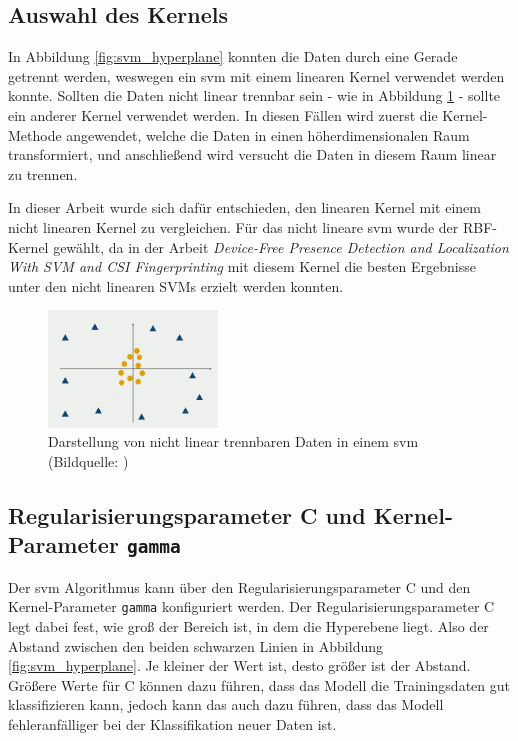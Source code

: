 \subsection{Auswahl des Kernels}

In Abbildung \ref{fig:svm_hyperplane} konnten die Daten durch eine Gerade getrennt werden, weswegen ein \gls{svm} mit einem linearen Kernel verwendet werden konnte. Sollten die Daten nicht linear trennbar sein - wie in Abbildung \ref{fig:source_svm_rbf} - sollte ein anderer Kernel verwendet werden. In diesen Fällen wird zuerst die Kernel-Methode angewendet, welche die Daten in einen höherdimensionalen Raum transformiert, und anschließend wird versucht die Daten in diesem Raum linear zu trennen.

In dieser Arbeit wurde sich dafür entschieden, den linearen Kernel mit einem nicht linearen Kernel zu vergleichen. Für das nicht lineare \gls{svm} wurde der RBF-Kernel gewählt, da in der Arbeit \textit{Device-Free Presence Detection and Localization With SVM and CSI Fingerprinting} mit diesem Kernel die besten Ergebnisse unter den nicht linearen SVMs erzielt werden konnten.

\begin{figure}[H]
    \centering
    \includegraphics[width=0.4\textwidth]{images/source_svm_rbf.png}
    \caption{Darstellung von nicht linear trennbaren Daten in einem \gls{svm} (Bildquelle: \citeauthor{databasecampSupportVector} \citeyear{databasecampSupportVector})}
    \label{fig:source_svm_rbf}
\end{figure}

\subsection{Regularisierungsparameter C und Kernel-Parameter \texttt{gamma}}


Der \gls{svm} Algorithmus kann über den Regularisierungsparameter C und den Kernel-Parameter \texttt{gamma} konfiguriert werden. Der Regularisierungsparameter C legt dabei fest, wie groß der Bereich ist, in dem die Hyperebene liegt. Also der Abstand zwischen den beiden schwarzen Linien in Abbildung \ref{fig:svm_hyperplane}. Je kleiner der Wert ist, desto größer ist der Abstand. Größere Werte für C können dazu führen, dass das Modell die Trainingsdaten gut klassifizieren kann, jedoch kann das auch dazu führen, dass das Modell fehleranfälliger bei der Klassifikation neuer Daten ist.

